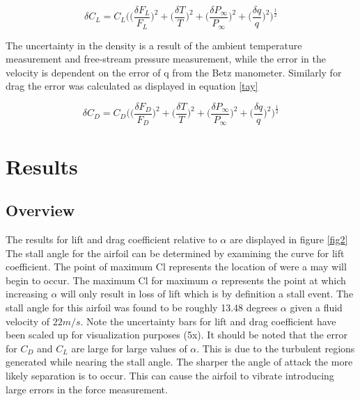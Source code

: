 \documentclass[paper=a4, fontsize=11pt, abstract=on]{scrartcl}
\numberwithin{equation}{section}		%
\numberwithin{figure}{section}			%
\numberwithin{table}{section}				%
\begin{document}
\begin{equation}
\label{taylor}
\delta C_L = C_L \Bigg(\Bigg(\frac{\delta F_L}{F_L}\Bigg)^2+\Bigg(\frac{\delta T}{T}\Bigg)^2+\Bigg(\frac{\delta P_{\infty}}{P_{\infty}}\Bigg)^2+\Bigg(\frac{\delta q}{q}\Bigg)^2\Bigg)^{\frac{1}{2}}
\end{equation}

The uncertainty in the density is a result of the ambient temperature measurement and free-stream pressure measurement, while the error in the velocity is dependent on the error of q from the Betz manometer. Similarly for drag the error was calculated as displayed in equation \ref{tay}

\begin{equation}
\label{tay}
\delta C_D = C_D \Bigg(\Bigg(\frac{\delta F_D}{F_D}\Bigg)^2+\Bigg(\frac{\delta T}{T}\Bigg)^2+\Bigg(\frac{\delta P_{\infty}}{P_{\infty}}\Bigg)^2+\Bigg(\frac{\delta q}{q}\Bigg)^2\Bigg)^{\frac{1}{2}}
\end{equation}
\newpage 
   
\section{Results}

\subsection{Overview}
The results for lift and drag coefficient relative to $\alpha$ are displayed in figure \ref{fig2} The stall angle for the airfoil can be determined by examining the curve for lift coefficient. The point of maximum Cl represents the location of were a may will begin to occur. The maximum Cl for maximum $\alpha$ represents the point at which increasing $\alpha$ will only result in loss of lift which is by definition a stall event. The stall angle for this airfoil was found to be roughly 13.48 degrees $\alpha$ given a fluid velocity of $22m/s$. Note the uncertainty bars for lift and drag coefficient have been scaled up for visualization purposes (5x). It should be noted that the error for $C_D$ and $C_L$ are large for large values of $\alpha$. This is due to the turbulent regions generated while nearing the stall angle. The sharper the angle of attack the more likely separation is to occur. This can cause the airfoil to vibrate introducing large errors in the force measurement.
\end{document}
